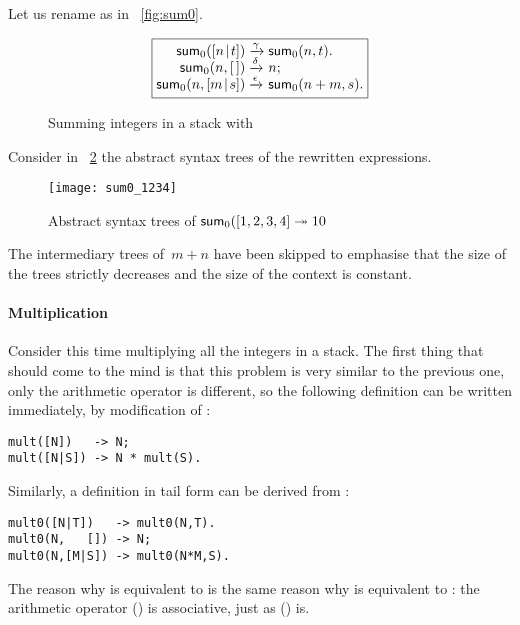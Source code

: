 Let us rename  as  in
\fig~\vref{fig:sum0}.
\begin{figure}
\begin{equation*}
\boxed{%
\begin{array}{@{}r@{\;}l@{\;}l@{}}
\fun{sum}_0(\cons{n}{t}) & \xrightarrow{\smash{\gamma}}
                         & \fun{sum}_0(n,t).\\
      \fun{sum}_0(n,\el) & \xrightarrow{\smash{\delta}} & n;\\
\fun{sum}_0(n,\cons{m}{s}) & \xrightarrow{\smash{\epsilon}}
                           & \fun{sum}_0(n+m,s).
\end{array}}
\end{equation*}
\caption{Summing integers in a stack with }
\label{fig:sum0}
\end{figure}
Consider in \fig~\ref{fig:sum0_1234} the abstract syntax trees of the
rewritten expressions.
\begin{figure}
\centering
\texttt{[image: sum0\_1234]}
\caption{Abstract syntax trees of \(\textsf{sum}_0([1,2,3,4]
  \twoheadrightarrow 10\)}
\label{fig:sum0_1234}
\end{figure}
The intermediary trees of~\(m+n\) have been skipped to emphasise that
the size of the trees strictly decreases and the size of the context
is constant.

\paragraph{Multiplication}

Consider this time multiplying all the integers in a stack. The first
thing that should come to the mind is that this problem is very
similar to the previous one, only the arithmetic operator is
different, so the following definition can be written immediately, by
modification of :
\begin{verbatim}
mult([N])   -> N;
mult([N|S]) -> N * mult(S).
\end{verbatim}
Similarly, a definition in tail form can be derived from
:
\begin{verbatim}
mult0([N|T])   -> mult0(N,T).
mult0(N,   []) -> N;
mult0(N,[M|S]) -> mult0(N*M,S).
\end{verbatim}
The reason why  is equivalent to  is
the same reason why  is equivalent to :
the arithmetic operator (\erlcode{*}) is associative, just as
(\erlcode{+}) is.

